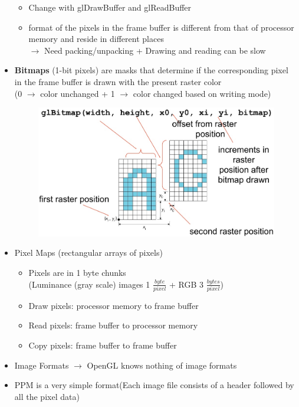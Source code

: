 \documentclass[11pt,a4paper]{article}
\begin{document}
\begin{itemize}
\begin{itemize}
					\item Change with glDrawBuffer and glReadBuffer
					\item format of the pixels in the frame buffer is different
					from that of processor memory and reside in different places\\
					$\rightarrow$ Need packing/unpacking + Drawing and reading can be slow
				\end{itemize}
			\item \textbf{Bitmaps} (1-bit pixels) are masks that determine if the corresponding pixel
			in the frame buffer is drawn with the present raster color\\(0 $\rightarrow$ color unchanged + 1 $\rightarrow$ color changed based on writing mode)
			\begin{figure}[h]
				\hspace{2.0cm}
				\vspace{-0.6cm}
				\includegraphics[scale=0.4]{pictures/DrawingBitmaps.jpg}
			\end{figure}
			\item Pixel Maps (rectangular arrays of pixels)
				\begin{itemize}
					\item Pixels are in 1 byte chunks\\
					(Luminance (gray scale) images 1 $\frac{byte}{pixel}$ + RGB 3 $\frac{bytes}{pixel}$)
					\item Draw pixels: processor memory to frame buffer
					\item Read pixels: frame buffer to processor memory
					\item Copy pixels: frame buffer to frame buffer
				\end{itemize}
			\item Image Formats $\rightarrow$ OpenGL knows nothing of image formats
			\item PPM is a very simple format(Each image file consists of a header followed by all the pixel data)
		\end{itemize}
\end{document}
